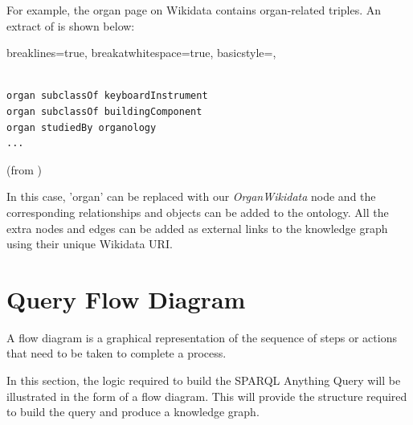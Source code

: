 For example, the organ page on Wikidata \cite{organwikidata} contains organ-related triples. An extract of \cite{organwikidata} is shown below:

\lstset
{
    breaklines=true,
    breakatwhitespace=true,
    basicstyle=\ttfamily,
}
\begin{lstlisting}

organ subclassOf keyboardInstrument
organ subclassOf buildingComponent
organ studiedBy organology 
...

\end{lstlisting}
(from \cite{organwikidata})

In this case, 'organ' can be replaced with our \textit{OrganWikidata} node and the corresponding relationships and objects can be added to the ontology. All the extra nodes and edges can be added as external links to the knowledge graph using their unique Wikidata URI. 

\section{Query Flow Diagram}
\hspace{0.5cm} A flow diagram is a graphical representation of the sequence of steps or actions that need to be taken to complete a process. \cite{flowchart}

In this section, the logic required to build the SPARQL Anything Query will be illustrated in the form of a flow diagram. This will provide the structure required to build the query and produce a knowledge graph.

